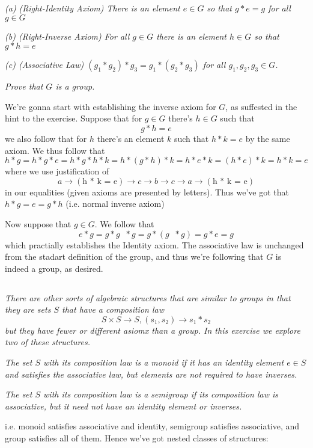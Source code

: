\documentclass[11pt,oneside,titlepage]{book}
\DeclareMathOperator \inv {^{-1}}
\begin{document}
\textit{(a) (Right-Identity Axiom) There is an element $e \in G$ so
that $g * e = g$ for all $g \in G$}

\textit{(b) (Right-Inverse Axiom) For all $g \in G$ there is an
element $h \in G$ so that $g * h = e$}

\textit{(c) (Associative Law) $(g_1 * g_2) * g_3 = g_1 * (g_2 * g_3)$
for all $g_1, g_2, g_3 \in G$.}

\textit{Prove that $G$ is a group.}

We're gonna start with establishing the inverse axiom for $G$, as
suffested in the hint to the exercise.  Suppose that for $g \in G$
there's $h \in G$ such that
$$g * h = e$$
we also follow that for $h$ there's an element $k$ such that $h * k =
e$ by the same axiom. We thus follow that
$$ h * g = h * g * e = h * g * h * k = h * (g * h) * k = h * e * k = (h * e) * k = h * k = e $$
where we use justification of
$$a \to (\text{h * k = e}) \to c \to b \to c \to a \to (\text{h * k = e})$$
in our equalities (given axioms are presented by letters).  Thus we've
got that $h * g = e = g * h$ (i.e. normal inverse axiom)

Now suppose that $g \in G$. We follow that
$$e * g = g * g\inv * g = g * (g\inv * g) =  g * e = g$$
which practially establishes the Identity axiom. The associative law
is unchanged from the stadart definition of the group, and thus we're
following that $G$ is indeed a group, as desired.

\subsection{}

\textit{There are other sorts of algebraic structures that are similar
to groups in that they are sets $S$ that have a composition law}
$$S \times S \to S, (s_1, s_2) \to s_1 * s_2$$
\textit{but they have fewer or different asiomx than a group. In this
exercise we explore two of these structures.}

\textit{The set $S$ with its composition law is a monoid if it has an
identity element $e \in S$ and satisfies the associative law, but
elements are not required to have inverses.}

\textit{The set $S$ with its composition law is a semigroup if its
composition law is associative, but it need not have an identity
element or inverses.}

i.e. monoid satisfies associative and identity, semigroup satisfies
associative, and group satisfies all of them. Hence we've got nested
classes of structures:
\end{document}
